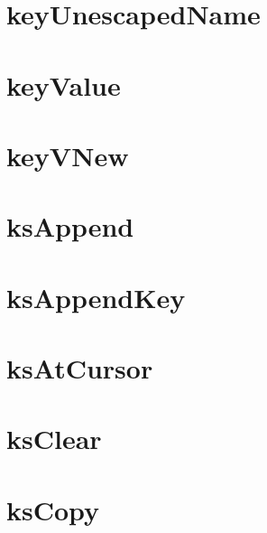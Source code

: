 \let\mypdfximage\pdfximage\def\pdfximage{\immediate\mypdfximage}\documentclass[twoside]{book}
\newcommand{\+}{\discretionary{\mbox{\scriptsize$\hookleftarrow$}}{}{}}
\begin{document}
\chapter{key\+Unescaped\+Name}
\label{doc_contrib_api_reviews_core_keyUnescapedName_md}

\chapter{key\+Value}
\label{doc_contrib_api_reviews_core_keyValue_md}

\chapter{key\+VNew}
\label{doc_contrib_api_reviews_core_keyVNew_md}

\chapter{ks\+Append}
\label{doc_contrib_api_reviews_core_ksAppend_md}

\chapter{ks\+Append\+Key}
\label{doc_contrib_api_reviews_core_ksAppendKey_md}

\chapter{ks\+At\+Cursor}
\label{doc_contrib_api_reviews_core_ksAtCursor_md}

\chapter{ks\+Clear}
\label{doc_contrib_api_reviews_core_ksClear_md}

\chapter{ks\+Copy}
\label{doc_contrib_api_reviews_core_ksCopy_md}

\end{document}
